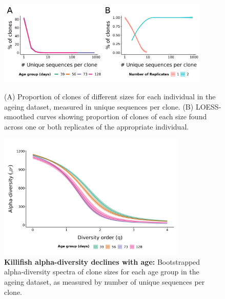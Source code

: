 \begin{figure}
\centering
\includegraphics[width = 0.9\textwidth]{_Figures/png/ageing-clone-sizes}
\begin{subfigure}{0em}
\label{fig:igseq-ageing-clone-sizes-sizes}
\end{subfigure}
\begin{subfigure}{0em}
\label{fig:igseq-ageing-clone-sizes-reps}
\end{subfigure}
\caption{(A) Proportion of clones of different sizes for each individual in the ageing dataset, measured in unique sequences per clone. (B) LOESS-smoothed curves showing proportion of clones of each size found across one or both replicates of the appropriate individual.}
\label{fig:igseq-ageing-clone-sizes}
\end{figure} %

\begin{figure}
\centering
\includegraphics[width = 0.8\textwidth]{_Figures/png/ageing-clone-diversity-alpha}
\caption{\textbf{Killifish alpha-diversity declines with age:} Bootstrapped alpha-diversity spectra of clone sizes for each age group in the \igseq ageing dataset, as measured by number of unique sequences per clone.}
\label{fig:igseq-ageing-clone-diversity-alpha}
\end{figure}

